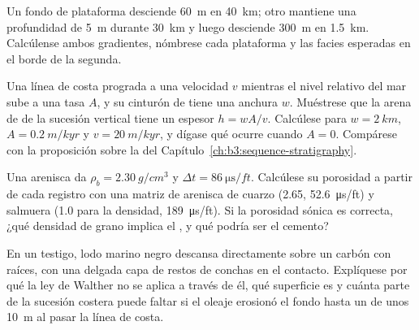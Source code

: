 \begin{exercise}[$\star\star$]\label{exo:b3:facies-models:9}
Un fondo de plataforma desciende \qty{60}{m} en \qty{40}{km}; otro mantiene una profundidad de
\qty{5}{m} durante \qty{30}{km} y luego desciende \qty{300}{m} en
\qty{1.5}{km}. Calcúlense ambos gradientes, nómbrese cada plataforma y las facies esperadas en
el borde de la segunda.
\end{exercise}

\begin{exercise}[$\star\star\star$]\label{exo:b3:facies-models:10}
Una línea de costa prograda a una velocidad $v$ mientras el nivel relativo del mar sube a una
tasa $A$, y su cinturón de  tiene una anchura $w$. Muéstrese que la arena de 
de la sucesión vertical tiene un espesor $h = wA/v$. Calcúlese para $w = \qty{2}{km}$,
$A = \qty{0.2}{m/kyr}$ y $v = \qty{20}{m/kyr}$, y dígase qué ocurre cuando
$A = 0$. Compárese con la proposición sobre la  del
Capítulo~\ref{ch:b3:sequence-stratigraphy}.
\end{exercise}

\begin{exercise}[$\star\star\star$]\label{exo:b3:facies-models:11}
Una arenisca da $\rho_b = \qty{2.30}{g/cm^3}$ y $\Delta t =
\qty{86}{\micro\second/ft}$. Calcúlese su porosidad a partir de cada registro con una
matriz de arenisca de cuarzo (2.65, \qty{52.6}{\micro\second/ft}) y salmuera (1.0 para la
densidad, \qty{189}{\micro\second/ft}). Si la porosidad sónica es correcta, ¿qué
densidad de grano implica el , y qué podría ser el cemento?
\end{exercise}

\begin{exercise}[$\star\star\star$]\label{exo:b3:facies-models:12}
En un testigo, lodo marino negro descansa directamente sobre un carbón con raíces, con una
delgada capa de restos de conchas en el contacto. Explíquese por qué la ley de Walther no
se aplica a través de él, qué superficie es y cuánta parte de la sucesión costera
puede faltar si el oleaje erosionó el fondo hasta un 
de unos \qty{10}{m} al pasar la línea de costa.
\end{exercise}

